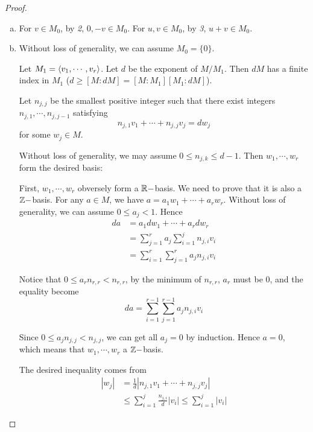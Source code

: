   \begin{proof}
    \begin{enumerate}[a)]
      \item For $v\in M_0$, by \emph{2}, $0,-v\in M_0$. For $u,v\in M_0$, by \emph{3}, $u+v\in M_0$.
      \item Without loss of generality, we can assume $M_0=\{0\}$.

               Let $M_1=\langle v_1,\cdots,v_r\rangle$. Let $d$ be the exponent of $M/M_1$.
               Then $dM$ has a finite index in $M_1$ ($d\geqslant[M:dM]=[M:M_1][M_1:dM]$).

               Let $n_{j,j}$ be the smallest positive integer such that there exist integers $n_{j,1},\cdots,n_{j,j-1}$ satisfying
               \begin{equation*}
                 n_{j,1}v_1+\cdots+n_{j,j}v_j=dw_j
               \end{equation*}
               for some $w_j\in M$.

               Without loss of generality, we may assume $0\leqslant n_{j,k}\leqslant d-1$. Then $w_1,\cdots,w_r$ form the desired basis:

               First, $w_1,\cdots,w_r$ obversely form a ${\mathbb R}-$basis. We need to prove that it is also a ${\mathbb Z}-$basis. For any $a\in M$, we have $a=a_1w_1+\cdots+a_rw_r$. Without loss of generality, we can assume $0\leqslant a_j<1$. Hence
               \begin{align*}
                 da & = a_1dw_1+\cdots+a_rdw_r \\
                  & = \sum_{j=1}^r a_j \sum_{i=1}^j n_{j,i}v_i \\
                  & = \sum_{i=1}^r\sum_{j=1}^r a_jn_{j,i}v_i
               \end{align*}

               Notice that $0\leqslant a_rn_{r,r}<n_{r,r}$, by the minimum of $n_{r,r}$, $a_r$ must be $0$, and the equality become
               \begin{equation*}
                 da=\sum_{i=1}^{r-1}\sum_{j=1}^{r-1} a_jn_{j,i}v_i
               \end{equation*}

               Since $0\leqslant a_jn_{j,j}<n_{j,j}$, we can get all $a_j=0$ by induction. Hence $a=0$, which means that $w_1,\cdots,w_r$ a ${\mathbb Z}-$basis.

               The desired inequality comes from
               \begin{align*}
                 |w_j| & = \frac{1}{d}|n_{j,1}v_1+\cdots+n_{j,j}v_j| \\
                  & \leqslant \sum_{i=1}^j\frac{n_{j,i}}{d}|v_i|\leqslant\sum_{i=1}^j|v_i|
               \end{align*}
    \end{enumerate}
  \end{proof}

